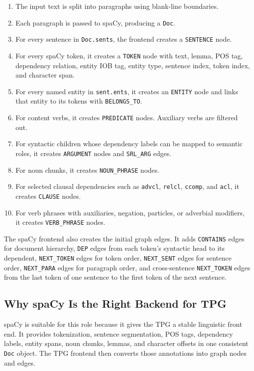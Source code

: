 \documentclass[11pt]{article}
\begin{document}
\begin{enumerate}
    \item The input text is split into paragraphs using blank-line boundaries.
    \item Each paragraph is passed to spaCy, producing a \texttt{Doc}.
    \item For every sentence in \texttt{Doc.sents}, the frontend creates a
    \texttt{SENTENCE} node.
    \item For every spaCy token, it creates a \texttt{TOKEN} node with text,
    lemma, POS tag, dependency relation, entity IOB tag, entity type, sentence
    index, token index, and character span.
    \item For every named entity in \texttt{sent.ents}, it creates an
    \texttt{ENTITY} node and links that entity to its tokens with
    \texttt{BELONGS\_TO}.
    \item For content verbs, it creates \texttt{PREDICATE} nodes. Auxiliary
    verbs are filtered out.
    \item For syntactic children whose dependency labels can be mapped to
    semantic roles, it creates \texttt{ARGUMENT} nodes and \texttt{SRL\_ARG}
    edges.
    \item For noun chunks, it creates \texttt{NOUN\_PHRASE} nodes.
    \item For selected clausal dependencies such as \texttt{advcl},
    \texttt{relcl}, \texttt{ccomp}, and \texttt{acl}, it creates
    \texttt{CLAUSE} nodes.
    \item For verb phrases with auxiliaries, negation, particles, or adverbial
    modifiers, it creates \texttt{VERB\_PHRASE} nodes.
\end{enumerate}

The spaCy frontend also creates the initial graph edges. It adds
\texttt{CONTAINS} edges for document hierarchy, \texttt{DEP} edges from each
token's syntactic head to its dependent, \texttt{NEXT\_TOKEN} edges for token
order, \texttt{NEXT\_SENT} edges for sentence order, \texttt{NEXT\_PARA} edges
for paragraph order, and cross-sentence \texttt{NEXT\_TOKEN} edges from the
last token of one sentence to the first token of the next sentence.

\subsection{Why spaCy Is the Right Backend for TPG}

spaCy is suitable for this role because it gives the TPG a stable linguistic
front end. It provides tokenization, sentence segmentation, POS tags,
dependency labels, entity spans, noun chunks, lemmas, and character offsets in
one consistent \texttt{Doc} object. The TPG frontend then converts those
annotations into graph nodes and edges.
\end{document}
